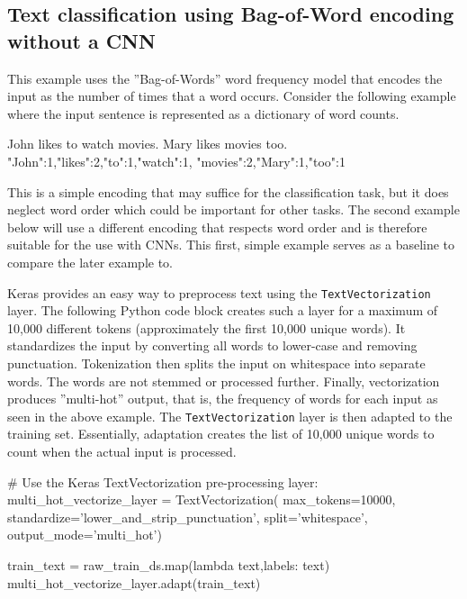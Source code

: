\subsection[Bag-ofWord encoding]{Text classification using Bag-of-Word encoding without a CNN}

This example uses the ''Bag-of-Words''  word frequency model that encodes the input as the number of times that a word occurs. Consider the following example where the input sentence is represented as a dictionary of word counts. 

\begin{samepage}
\begin{textcode}
John likes to watch movies. Mary likes movies too.
{"John":1,"likes":2,"to":1,"watch":1, "movies":2,"Mary":1,"too":1}
\end{textcode}
\end{samepage}

This is a simple encoding that may suffice for the classification task, but it does neglect word order which could be important for other tasks. The second example below will use a different encoding that respects word order and is therefore suitable for the use with CNNs. This first, simple example serves as a baseline to compare the later example to.

Keras provides an easy way to preprocess text using the \texttt{TextVectorization} layer. The following Python code block creates such a layer for a maximum of 10,000 different tokens (approximately the first 10,000 unique words). It standardizes the input by converting all words to lower-case and removing punctuation. Tokenization then splits the input on whitespace into separate words. The words are not stemmed or processed further. Finally, vectorization produces ''multi-hot'' output, that is, the frequency of words for each input as seen in the above example. The \texttt{TextVectorization} layer is then adapted to the training set. Essentially, adaptation creates the list of 10,000 unique words to count when the actual input is processed.

\begin{samepage}
\begin{pythoncode}
# Use the Keras TextVectorization pre-processing layer:
multi_hot_vectorize_layer = TextVectorization(
    max_tokens=10000,
    standardize='lower_and_strip_punctuation',
    split='whitespace',
    output_mode='multi_hot')
    
train_text = raw_train_ds.map(lambda text,labels: text)
multi_hot_vectorize_layer.adapt(train_text)
\end{pythoncode}
\end{samepage}

